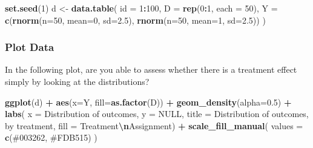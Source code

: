 \documentclass[
]{article}
\newenvironment{Shaded}{\begin{snugshade}}{\end{snugshade}}
\newcommand{\AttributeTok}[1]{\textcolor[rgb]{0.13,0.29,0.53}{#1}}
\newcommand{\ConstantTok}[1]{\textcolor[rgb]{0.56,0.35,0.01}{#1}}
\newcommand{\DecValTok}[1]{\textcolor[rgb]{0.00,0.00,0.81}{#1}}
\newcommand{\FloatTok}[1]{\textcolor[rgb]{0.00,0.00,0.81}{#1}}
\newcommand{\FunctionTok}[1]{\textcolor[rgb]{0.13,0.29,0.53}{\textbf{#1}}}
\newcommand{\NormalTok}[1]{#1}
\newcommand{\OtherTok}[1]{\textcolor[rgb]{0.56,0.35,0.01}{#1}}
\newcommand{\SpecialCharTok}[1]{\textcolor[rgb]{0.81,0.36,0.00}{\textbf{#1}}}
\newcommand{\StringTok}[1]{\textcolor[rgb]{0.31,0.60,0.02}{#1}}
\theoremstyle{definition}
\theoremstyle{definition}
\theoremstyle{definition}
\theoremstyle{definition}
\theoremstyle{remark}
\begin{document}
\begin{Shaded}
\begin{Highlighting}[]
\FunctionTok{set.seed}\NormalTok{(}\DecValTok{1}\NormalTok{)}
\NormalTok{d }\OtherTok{\textless{}{-}} \FunctionTok{data.table}\NormalTok{(}
  \AttributeTok{id =} \DecValTok{1}\SpecialCharTok{:}\DecValTok{100}\NormalTok{, }
  \AttributeTok{D  =} \FunctionTok{rep}\NormalTok{(}\DecValTok{0}\SpecialCharTok{:}\DecValTok{1}\NormalTok{, }\AttributeTok{each =} \DecValTok{50}\NormalTok{), }
  \AttributeTok{Y  =} \FunctionTok{c}\NormalTok{(}\FunctionTok{rnorm}\NormalTok{(}\AttributeTok{n=}\DecValTok{50}\NormalTok{, }\AttributeTok{mean=}\DecValTok{0}\NormalTok{, }\AttributeTok{sd=}\FloatTok{2.5}\NormalTok{), }\FunctionTok{rnorm}\NormalTok{(}\AttributeTok{n=}\DecValTok{50}\NormalTok{, }\AttributeTok{mean=}\DecValTok{1}\NormalTok{, }\AttributeTok{sd=}\FloatTok{2.5}\NormalTok{))}
\NormalTok{)}
\end{Highlighting}
\end{Shaded}

\subsubsection{Plot Data}\label{plot-data}

In the following plot, are you able to assess whether there is a treatment effect simply by looking at the distributions?

\begin{Shaded}
\begin{Highlighting}[]
\FunctionTok{ggplot}\NormalTok{(d) }\SpecialCharTok{+} 
  \FunctionTok{aes}\NormalTok{(}\AttributeTok{x=}\NormalTok{Y, }\AttributeTok{fill=}\FunctionTok{as.factor}\NormalTok{(D)) }\SpecialCharTok{+} 
  \FunctionTok{geom\_density}\NormalTok{(}\AttributeTok{alpha=}\FloatTok{0.5}\NormalTok{) }\SpecialCharTok{+} 
  \FunctionTok{labs}\NormalTok{(}
    \AttributeTok{x        =} \StringTok{\textquotesingle{}Distribution of outcomes\textquotesingle{}}\NormalTok{, }
    \AttributeTok{y        =} \ConstantTok{NULL}\NormalTok{, }
    \AttributeTok{title    =} \StringTok{\textquotesingle{}Distribution of outcomes, by treatment\textquotesingle{}}\NormalTok{, }
    \AttributeTok{fill    =} \StringTok{\textquotesingle{}Treatment}\SpecialCharTok{\textbackslash{}n}\StringTok{Assignment\textquotesingle{}}\NormalTok{) }\SpecialCharTok{+} 
  \FunctionTok{scale\_fill\_manual}\NormalTok{(}
    \AttributeTok{values =} \FunctionTok{c}\NormalTok{(}\StringTok{\textquotesingle{}\#003262\textquotesingle{}}\NormalTok{, }\StringTok{\textquotesingle{}\#FDB515\textquotesingle{}}\NormalTok{)}
\NormalTok{  )}
\end{Highlighting}
\end{Shaded}
\end{document}
